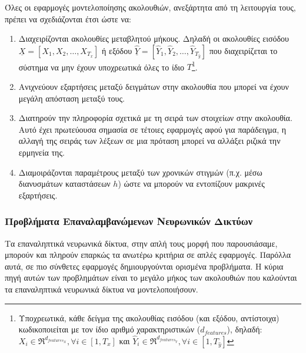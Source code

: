 Όλες οι εφαρμογές μοντελοποίησης ακολουθιών, ανεξάρτητα από τη λειτουργία τους, πρέπει να σχεδιάζονται έτσι ώστε να:
\begin{enumerate}
  \item Διαχειρίζονται ακολουθίες μεταβλητού μήκους. Δηλαδή οι ακολουθίες εισόδου $\underline{X} = [X_1, X_2, \dots, X_{T_{x}}]$ ή εξόδου $\underline{\hat{Y}} = [\hat{Y}_1, \hat{Y}_2, \dots, \hat{Y}_{T_{\hat{y}}}]$  που διαχειρίζεται το σύστημα να μην έχουν υποχρεωτικά όλες το ίδιο $T$\footnote{Υποχρεωτικά, κάθε δείγμα της ακολουθίας εισόδου (και εξόδου, αντίστοιχα) κωδικοποιείται με τον ίδιο αριθμό χαρακτηριστικών ($d_{features}$), δηλαδή: $X_i \in \Re^{d_{{features}_X}}, \forall i \in [1, T_{x}]$ και $\hat{Y}_i \in \Re^{d_{{features}_{\hat{Y}}}}, \forall i \in [1, T_{\hat{y}}]$}.
  \item Ανιχνεύουν εξαρτήσεις μεταξύ δειγμάτων στην ακολουθία που μπορεί να έχουν μεγάλη απόσταση μεταξύ τους.
  \item Διατηρούν την πληροφορία σχετικά με τη σειρά των στοιχείων στην ακολουθία. Αυτό έχει πρωτεύουσα σημασία σε τέτοιες εφαρμογές αφού για παράδειγμα, η αλλαγή της σειράς των λέξεων σε μια πρόταση μπορεί να αλλάξει ριζικά την ερμηνεία της.
  \item Διαμοιράζονται παραμέτρους μεταξύ των χρονικών στιγμών (π.χ. μέσω διανυσμάτων καταστάσεων $h$) ώστε να μπορούν να εντοπίζουν μακρινές εξαρτήσεις. \cite{youtubeRNN}
\end{enumerate}

\subsubsection{Προβλήματα Επαναλαμβανώμενων Νευρωνικών Δικτύων}
Τα επαναληπτικά νευρωνικά δίκτυα, στην απλή τους μορφή που παρουσιάσαμε, μπορούν και πληρούν επαρκώς τα ανωτέρω κριτήρια σε απλές εφαρμογές. Παρόλλα αυτά, σε πιο σύνθετες εφαρμογές δημιουργούνται ορισμένα προβλήματα. Η κύρια πηγή αυτών των προβλημάτων είναι το μεγάλο μήκος των ακολουθιών που καλούνται τα επαναληπτικά νευρωνικά δίκτυα να μοντελοποιήσουν.\par

